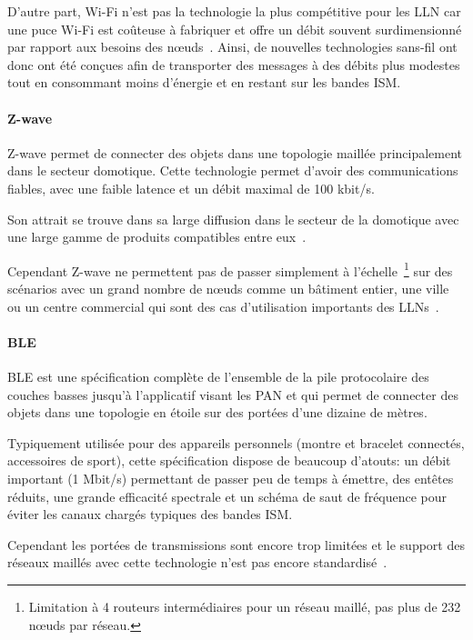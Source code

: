D'autre part, Wi-Fi n'est pas la technologie la plus compétitive pour les \ac{LLN} car une puce Wi-Fi est coûteuse à fabriquer et offre un débit souvent surdimensionné par rapport aux besoins des nœuds~\cite{wifiCritic}.
Ainsi, de nouvelles technologies sans-fil ont donc ont été conçues afin de transporter des messages à des débits plus modestes tout en consommant moins d'énergie et en restant sur les bandes \ac{ISM}.

\paragraph{Z-wave}

Z-wave permet de connecter des objets dans une topologie maillée principalement dans le secteur domotique.
Cette technologie permet d'avoir des communications fiables, avec une faible latence et un débit maximal de 100 kbit/s.

Son attrait se trouve dans sa large diffusion dans le secteur de la domotique avec une large gamme de produits compatibles entre eux~\cite{zwaveCritic}.

Cependant Z-wave ne permettent pas de passer simplement à l'échelle~\footnote{Limitation à 4 routeurs intermédiaires pour un réseau maillé, pas plus de 232 nœuds par réseau.} sur des scénarios avec un grand nombre de nœuds comme un bâtiment entier, une ville ou un centre commercial qui sont des cas d'utilisation importants des \ac{LLN}s~\cite{zwaveCritic}.

\paragraph{\ac{BLE}}

\ac{BLE} est une spécification complète de l'ensemble de la pile protocolaire des couches basses jusqu'à l'applicatif visant les \ac{PAN} et qui permet de connecter des objets dans une topologie en étoile sur des portées d'une dizaine de mètres.

Typiquement utilisée pour des appareils personnels (montre et bracelet connectés, accessoires de sport), cette spécification dispose de beaucoup d'atouts: un débit important (1 Mbit/s) permettant de passer peu de temps à émettre, des entêtes réduits, une grande efficacité spectrale et un schéma de saut de fréquence pour éviter les canaux chargés typiques des bandes \ac{ISM}.

Cependant les portées de transmissions sont encore trop limitées et le support des réseaux maillés avec cette technologie n'est pas encore standardisé~\cite{bleCritic}.

